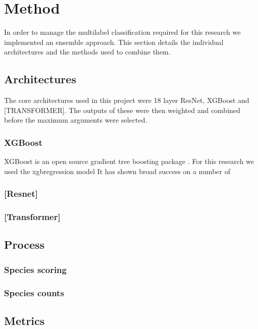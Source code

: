 \clearpage  %

\section{Method}

In order to manage the multilabel classification required for this research we implemented an ensemble approach. 
This section details the individual architectures and the methods used to combine them.

\subsection{Architectures}

The core architectures used in this project were 18 layer ResNet, XGBoost and [TRANSFORMER]. The outputs of these were 
then weighted and combined before the maximum arguments were selected.

\subsubsection{XGBoost}
XGBoost is an open source gradient tree boosting package \cite{xgboost}. For this research we used the xgbregression model It has shown broad success on a number of 
\subsubsection{[Resnet]}
\subsubsection{[Transformer]}

\subsection{Process}
\subsubsection{Species scoring}
\subsubsection{Species counts}
\subsection{Metrics}

